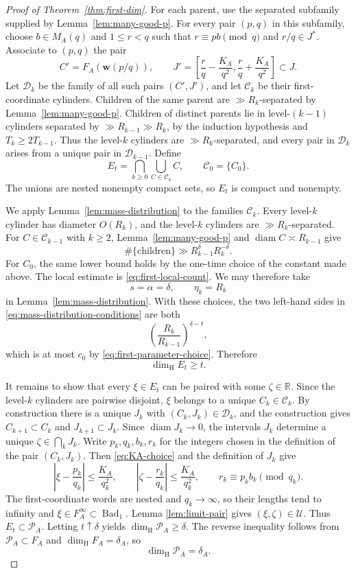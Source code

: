 \documentclass[11pt]{amsart}
\newcommand{\R}{\mathbb R}
\newcommand{\Bad}{\operatorname{Bad}}
\newcommand{\diam}{\operatorname{diam}}
\newcommand{\dimH}{\dim_{\mathrm H}}
\newcommand{\cP}{\mathcal P}
\begin{document}
\begin{proof}[Proof of Theorem~\ref{thm:first-dim}]
For each parent, use the separated subfamily supplied by
Lemma~\ref{lem:many-good-p}.  For every pair $(p,q)$ in this subfamily, choose
$b\in M_A(q)$ and $1\le r<q$ such that
$r\equiv pb\pmod q$ and $r/q\in J^*$.  Associate to $(p,q)$ the pair
$$
 C'=F_A(\mathbf{w}(p/q)),
 \qquad
 J'=\left[\frac rq-\frac{K_A}{q^2},
          \frac rq+\frac{K_A}{q^2}\right]\subset J.
$$
Let $\mathcal D_k$ be the family of all such pairs $(C',J')$, and let
$\mathcal C_k$ be their first-coordinate cylinders.  Children of the same
parent are $\gg R_k$-separated by Lemma~\ref{lem:many-good-p}.  Children of
distinct parents lie in level-$(k-1)$ cylinders separated by
$\gg R_{k-1}\gg R_k$, by the induction hypothesis and $T_k\ge2T_{k-1}$.
Thus the level-$k$ cylinders are $\gg R_k$-separated, and every pair in
$\mathcal D_k$ arises from a unique pair in $\mathcal D_{k-1}$.  Define
\begin{equation}\label{eq:first-cantor-set}
 E_t=\bigcap_{k\ge0}\bigcup_{C\in\mathcal C_k}C,
 \qquad \mathcal C_0=\{C_0\}.
\end{equation}
The unions are nested nonempty compact sets, so $E_t$ is compact and nonempty.

We apply Lemma~\ref{lem:mass-distribution} to the families
$\mathcal C_k$.  Every level-$k$ cylinder has diameter $O(R_k)$, and the level-$k$ cylinders are $\gg R_k$-separated.  For $C\in\mathcal C_{k-1}$ with $k\ge2$,
Lemma~\ref{lem:many-good-p} and $\diam C\asymp R_{k-1}$ give
$$
 \#\{\text{children}\}
 \gg R_{k-1}^\delta R_k^{-\delta}.
$$
For $C_0$, the same lower bound holds by the one-time choice of the constant
made above.  The local estimate is \eqref{eq:first-local-count}.  We may therefore
take
$$
 s=\alpha=\delta,\qquad \eta_k=R_k
$$
in Lemma~\ref{lem:mass-distribution}.  With these choices, the two left-hand
sides in \eqref{eq:mass-distribution-conditions} are both
$$
 \left(\frac{R_k}{R_{k-1}}\right)^{\delta-t},
$$
which is at most $c_0$ by \eqref{eq:first-parameter-choice}.  Therefore
$$
 \dimH E_t\ge t.
$$

It remains to show that every $\xi\in E_t$ can be paired with some
$\zeta\in\R$.  Since the level-$k$ cylinders are pairwise disjoint, $\xi$
belongs to a unique $C_k\in\mathcal C_k$.  By construction there is a unique
$J_k$ with $(C_k,J_k)\in\mathcal D_k$, and the construction gives
$C_{k+1}\subset C_k$ and $J_{k+1}\subset J_k$.  Since $\diam J_k\to0$, the intervals $J_k$ determine a unique
$\zeta\in\bigcap_kJ_k$.  Write $p_k,q_k,b_k,r_k$ for the integers chosen in the
definition of the pair $(C_k,J_k)$.  Then \eqref{eq:KA-choice} and the
definition of $J_k$ give
$$
 \left|\xi-\frac{p_k}{q_k}\right|\le\frac{K_A}{q_k^2},
 \qquad
 \left|\zeta-\frac{r_k}{q_k}\right|\le\frac{K_A}{q_k^2},
 \qquad
 r_k\equiv p_kb_k\pmod{q_k}.
$$
The first-coordinate words are nested and $q_k\to\infty$, so their lengths
tend to infinity and $\xi\in F_A^\infty\subset\Bad_1$.  Lemma
\ref{lem:limit-pair} gives $(\xi,\zeta)\in \mathcal U$.  Thus
$E_t\subset\cP_A$.  Letting
$t\uparrow\delta$ yields $\dimH\cP_A\ge\delta$.  The reverse inequality follows
from $\cP_A\subset F_A$ and $\dimH F_A=\delta_A$, so
$$
 \dimH\cP_A=\delta_A.
$$


\end{proof}
\end{document}
